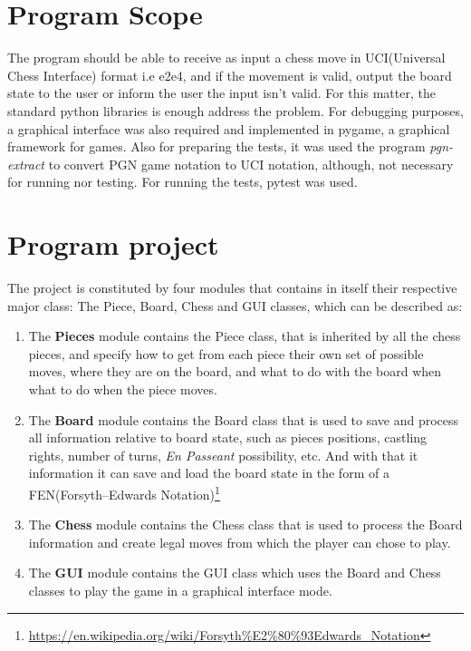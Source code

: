\documentclass[10pt]{article}
\author{}
\title{}
\date{}
\begin{document}
\maketitle

\section{Program Scope}

The program should be able to receive as input a chess move in UCI(Universal
Chess Interface) format i.e
e2e4, and if the movement is valid, output the board state to the user or inform
the user the input isn't valid. For this matter, the standard python libraries is
enough address the problem. For debugging purposes, a graphical interface was
also required and implemented in pygame, a graphical framework for games. Also
for preparing the tests, it was used the program
\textit{pgn-extract} to convert PGN game notation to UCI notation, although, not
necessary for running nor testing. For running the tests, pytest was used.


\section{Program project}

The project is constituted by four modules that contains in itself their
respective major class: The Piece, Board, Chess and GUI classes, which can be
described as:
\begin{enumerate}
    \item The \textbf{Pieces} module contains the Piece class, that is inherited by all
        the chess pieces, and specify how to get from each piece their own set
        of possible moves, where they are on the board, and what to do with
        the board when what to do when the piece moves.
        \item The \textbf{Board} module contains the Board class that is used to save and
            process all
            information relative to board state, such as pieces positions,
            castling rights, number of turns, \textit{En Passeant} possibility, etc.
            And with that it information it can save and load the board state
            in the form of a FEN(Forsyth–Edwards
            Notation)\footnote{\url{https://en.wikipedia.org/wiki/Forsyth\%E2\%80\%93Edwards_Notation}}
        \item The \textbf{Chess} module contains the Chess class that is used to process
            the Board information and create legal moves from which the player
            can chose to play.
        \item The \textbf{GUI} module contains the GUI class which uses the Board and Chess classes to play the game in a graphical interface mode.
\end{enumerate}
\end{document}
